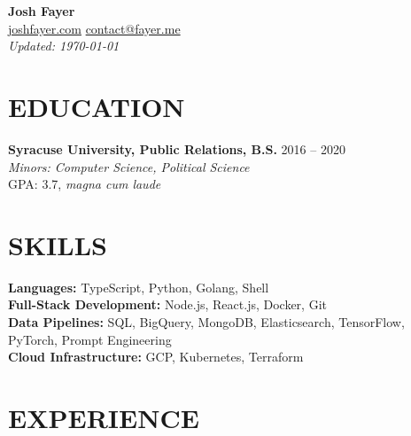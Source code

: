 \documentclass[letterpaper,10pt]{article}
\begin{document}
\begin{center}
    {\huge\textbf{Josh Fayer}} \\
        \href{https://joshfayer.com}{joshfayer.com} \quad
        \href{mailto:contact@fayer.me}{contact@fayer.me} \quad \\
        \emph{Updated: \monthyear\today}
\end{center}

\vspace{0.1cm}

\section*{EDUCATION}
\noindent\textbf{Syracuse University, Public Relations, B.S.} \hfill 2016 -- 2020 \\
\emph{Minors: Computer Science, Political Science} \\
GPA: 3.7, \emph{magna cum laude}

\section*{SKILLS}
\noindent\textbf{Languages:} TypeScript, Python, Golang, Shell \\
\noindent\textbf{Full-Stack Development:} Node.js, React.js, Docker, Git \\
\noindent\textbf{Data Pipelines:} SQL, BigQuery, MongoDB, Elasticsearch, TensorFlow, PyTorch, Prompt Engineering \\
\textbf{Cloud Infrastructure:} GCP, Kubernetes, Terraform

\section*{EXPERIENCE}

\end{document}
